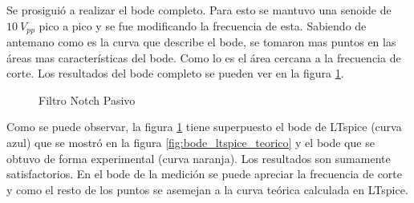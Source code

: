 Se prosiguió a realizar el bode completo. Para esto se mantuvo una senoide de $10 \ V_{pp}$ pico a pico
y se fue modificando la frecuencia de esta. Sabiendo de antemano como es la curva que 
describe el bode, se tomaron mas puntos en las áreas mas características del bode. Como lo es el área cercana a la frecuencia de corte. Los resultados del bode completo se pueden ver en la figura \ref{fig:superpuesto}.

\begin{figure}[H] 
\begin{center}
\caption{Filtro Notch Pasivo}
\label{fig:superpuesto}
\end{center}
\end{figure}


Como se puede observar, la figura \ref{fig:superpuesto} tiene superpuesto el bode
de LTspice (curva azul) que se mostró en la figura \ref{fig:bode_ltspice_teorico} y el bode que se obtuvo de forma experimental (curva naranja). Los resultados son sumamente satisfactorios. En el bode de la medición se puede apreciar la frecuencia de corte y como el resto de los puntos se asemejan a la curva teórica calculada en LTspice. 



